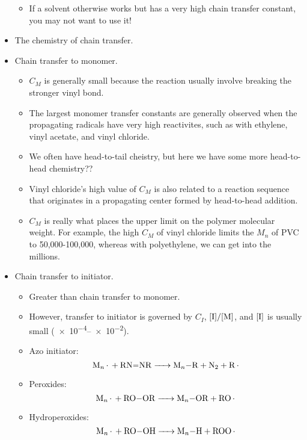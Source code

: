 \documentclass[../notes.tex]{subfiles}
\begin{document}
\begin{itemize}
\begin{itemize}
        \item If a solvent otherwise works but has a very high chain transfer constant, you may not want to use it!
    \end{itemize}
    \item The chemistry of chain transfer.
    \item Chain transfer to monomer.
    \begin{itemize}
        \item $C_M$ is generally small because the reaction usually involve breaking the stronger vinyl  bond.
        \item The largest monomer transfer constants are generally observed when the propagating radicals have very high reactivites, such as with ethylene, vinyl acetate, and vinyl chloride.
        \item We often have head-to-tail cheistry, but here we have some more head-to-head chemistry??
        \item Vinyl chloride's high value of $C_M$ is also related to a reaction sequence that originates in a propagating center formed by head-to-head addition.
        \item $C_M$ is really what places the upper limit on the polymer molecular weight. For example, the high $C_M$ of vinyl chloride limits the $M_n$ of PVC to 50,000-100,000, whereas with polyethylene, we can get into the millions.
    \end{itemize}
    \item Chain transfer to initiator.
    \begin{itemize}
        \item Greater than chain transfer to monomer.
        \item However, transfer to initiator is governed by $C_I$, $[\ce{I}]/[\ce{M}]$, and $[\ce{I}]$ is usually small (\SIrange{e-4}{e-2}{\molar}).
        \item Azo initiator:
        \begin{equation*}
            \ce{M_n* + RN=NR -> M_n-R + N_2 + R*}
        \end{equation*}
        \item Peroxides:
        \begin{equation*}
            \ce{M_n* + RO-OR -> M_n-OR + RO*}
        \end{equation*}
        \item Hydroperoxides:
        \begin{equation*}
            \ce{M_n* + RO-OH -> M_n-H + ROO*}

\end{equation*}
\end{itemize}
\end{itemize}
\end{document}
